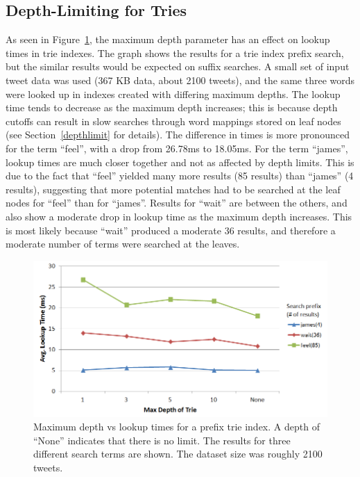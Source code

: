 \documentclass{vldb}
\begin{document}
\subsection{Depth-Limiting for Tries}
As seen in Figure~\ref{comptrie}, the maximum depth parameter has an effect on lookup times in trie indexes. The graph shows the results for a trie index prefix search, but the similar results would be expected on suffix searches. A small set of input tweet data was used (367 KB data, about 2100 tweets), and the same three words were looked up in indexes created with differing maximum depths. The lookup time tends to decrease as the maximum depth increases; this is because depth cutoffs can result in slow searches through word mappings stored on leaf nodes (see Section~\ref{depthlimit} for details). The difference in times is more pronounced for the term ``feel'', with a drop from 26.78ms to 18.05ms. For the term ``james'', lookup times are much closer together and not as affected by depth limits. This is due to the fact that ``feel'' yielded many more results (85 results) than ``james'' (4 results), suggesting that more potential matches had to be searched at the leaf nodes for ``feel'' than for ``james''. Results for ``wait'' are between the others, and also show a moderate drop in lookup time as the maximum depth increases. This is most likely because ``wait'' produced a moderate 36 results, and therefore a moderate number of terms were searched at the leaves.

\begin{figure}[h!]
   \includegraphics[scale=.43]{trie_maxdepth_graph}
  \caption{Maximum depth vs lookup times for a prefix trie index. A depth of ``None'' indicates that there is no limit. The results for three different search terms are shown. The dataset size was roughly 2100 tweets.}
\label{comptrie}
\end{figure}
\end{document}
